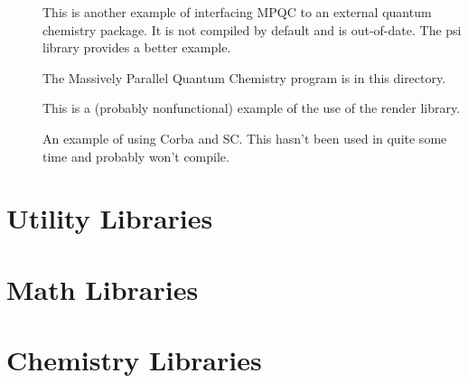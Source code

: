 \documentclass{report}
\begin{document}
\begin{description}
\item[] This is another example of
  interfacing MPQC to an external quantum chemistry package.  It
  is not compiled by default and is out-of-date.  The psi library
  provides a better example.

\item[]
  The Massively Parallel Quantum Chemistry program is in this directory.

\item[]
  This is a (probably nonfunctional) example of the use of the render
  library.

\item[]
  An example of using Corba and SC.  This hasn't been used in quite
  some time and probably won't compile.

\end{description}

\part{Utility Libraries}








\part{Math Libraries}





\part{Chemistry Libraries}



\printindex
\end{document}
